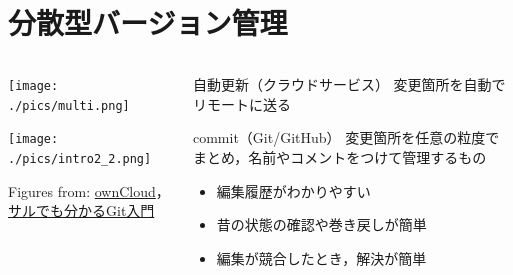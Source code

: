 \documentclass[12pt,dvipdfmx,svgnames,uplatex,aspectratio=169]{beamer}
\begin{document}
\section{分散型バージョン管理}
\begin{frame}{\insertsection}
  \begin{columns}[c] %
    \begin{column}{0.5\textwidth}
      \texttt{[image: ./pics/multi.png]}

      \texttt{[image: ./pics/intro2\_2.png]}

      \scriptsize{Figures from: \href{https://owncloud.jp}{ownCloud}，\href{https://backlog.com/ja/git-tutorial/}{サルでも分かるGit入門}}
    \end{column}
    \begin{column}{0.5\textwidth}
      \begin{block}{自動更新（クラウドサービス）}
        変更箇所を自動でリモートに送る
      \end{block}
      \begin{block}{commit（Git/GitHub）}
        変更箇所を任意の粒度でまとめ，名前やコメントをつけて管理するもの
        \begin{itemize}
          \item 編集履歴がわかりやすい
          \item 昔の状態の確認や巻き戻しが簡単
          \item 編集が競合したとき，解決が簡単
        \end{itemize}
      \end{block}
    \end{column}
  \end{columns}
\end{frame}
\end{document}
